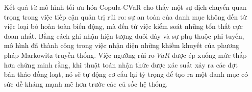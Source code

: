 Kết quả từ mô hình tối ưu hóa Copula-CVaR cho thấy một sự dịch chuyển quan trọng trong việc tiếp cận quản trị rủi ro: sự an toàn của danh mục không đến từ việc loại bỏ hoàn toàn biến động, mà đến từ việc kiểm soát những tổn thất cực đoan nhất. Bằng cách ghi nhận hiện tượng đuôi dày và sự phụ thuộc phi tuyến, mô hình đã thành công trong việc nhận diện những khiếm khuyết của phương pháp Markowitz truyền thống. Việc ngưỡng rủi ro $VaR$ được ép xuống mức thấp hơn chứng minh rằng, khi thuật toán nhận thức được xác suất xảy ra các đợt bán tháo đồng loạt, nó sẽ tự động cơ cấu lại tỷ trọng để tạo ra một danh mục có sức đề kháng mạnh mẽ hơn trước các cú sốc hệ thống.